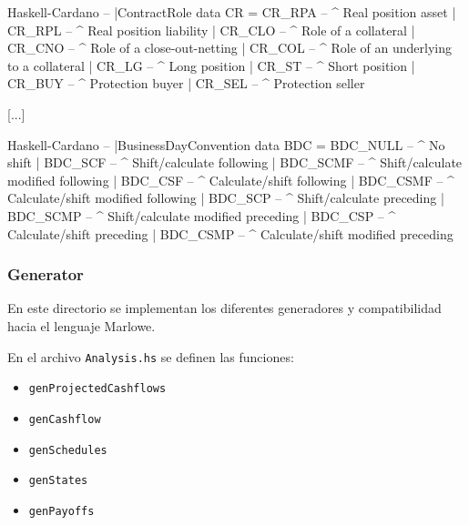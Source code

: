 \documentclass[12pt]{book}
\begin{document}
\begin{code}[title=Algunos tipos de roles de contrato.]{Haskell-Cardano}
-- |ContractRole
data CR = CR_RPA -- ^ Real position asset
        | CR_RPL -- ^ Real position liability
        | CR_CLO -- ^ Role of a collateral
        | CR_CNO -- ^ Role of a close-out-netting
        | CR_COL -- ^ Role of an underlying to a collateral
        | CR_LG  -- ^ Long position
        | CR_ST  -- ^ Short position
        | CR_BUY -- ^ Protection buyer
        | CR_SEL -- ^ Protection seller

        [...]
\end{code}


\begin{code}[title=Tipos de convención sobre días laborables.]{Haskell-Cardano}
-- |BusinessDayConvention
data BDC = BDC_NULL -- ^ No shift
         | BDC_SCF  -- ^ Shift/calculate following
         | BDC_SCMF -- ^ Shift/calculate modified following
         | BDC_CSF  -- ^ Calculate/shift following
         | BDC_CSMF -- ^ Calculate/shift modified following
         | BDC_SCP  -- ^ Shift/calculate preceding
         | BDC_SCMP -- ^ Shift/calculate modified preceding
         | BDC_CSP  -- ^ Calculate/shift preceding
         | BDC_CSMP -- ^ Calculate/shift modified preceding
\end{code}


\subsubsection{Generator}

En este directorio se implementan los diferentes generadores y compatibilidad hacia el lenguaje Marlowe.



En el archivo \texttt{Analysis.hs} se definen las funciones:

\begin{itemize}
    \item \texttt{genProjectedCashflows}
    \item \texttt{genCashflow}
    \item \texttt{genSchedules}
    \item \texttt{genStates}
    \item \texttt{genPayoffs}
\end{itemize}
\end{document}
